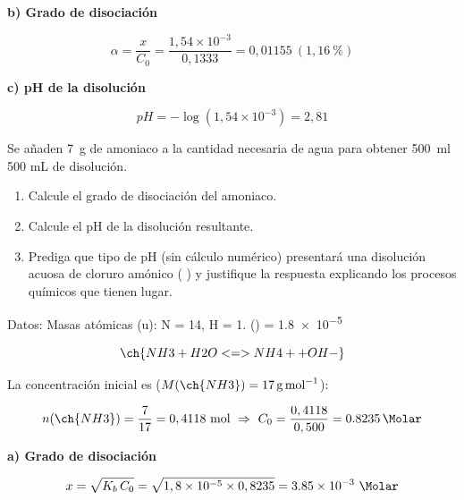 \begin{exerciseEVAU}
\begin{solu}
        \textbf{b) Grado de disociación}

        \begin{equation*}
            \alpha = \dfrac{x}{C_0} = \dfrac{1,54\times10^{-3}}{0,1333} = 0,01155 \ (1,16\ \%)
        \end{equation*}

        \textbf{c) pH de la disolución}

        \begin{equation*}
            pH = -\log(1,54 \times 10^{-3}) = 2,81
        \end{equation*}

    \end{solu}
\end{exerciseEVAU}

\begin{exerciseEVAU}
    Se añaden \SI{7}{\g}  de amoniaco a la cantidad necesaria de agua para obtener \SI{500}{\milli\litre}  500 mL de disolución.
    \begin{enumerate}[label=\letraminuscula]
        \item Calcule el grado de disociación del amoniaco.
        \item Calcule el pH de la disolución resultante.
        \item Prediga que tipo de pH (sin cálculo numérico) presentará una disolución acuosa de cloruro amónico ( ) y justifique la respuesta explicando los procesos químicos que tienen lugar.
    \end{enumerate}

    Datos: Masas atómicas (u): N = 14, H = 1. \Kb () = \num{1.8e-5}
    \begin{solu}

        \begin{equation*}
            \ch{NH3 + H2O <=> NH4+ + OH-}
        \end{equation*}

        La concentración inicial es (\(M(\ch{NH3}) = \SI{17}{\gram\per\mole}\)):

        \begin{equation*}
            n(\ch{NH3}) = \dfrac{7}{17} = 0,4118 \ \text{mol} \ \Rightarrow \ C_0 = \dfrac{0,4118}{0,500} = \SI{0.8235}{\Molar}
        \end{equation*}

        \textbf{a) Grado de disociación}

        \begin{equation*}
            x = \sqrt{K_b\, C_0} = \sqrt{1,8\times10^{-5} \times 0,8235} = \num{3.85e-3} \ \si{\Molar}
        \end{equation*}


\end{solu}
\end{exerciseEVAU}

